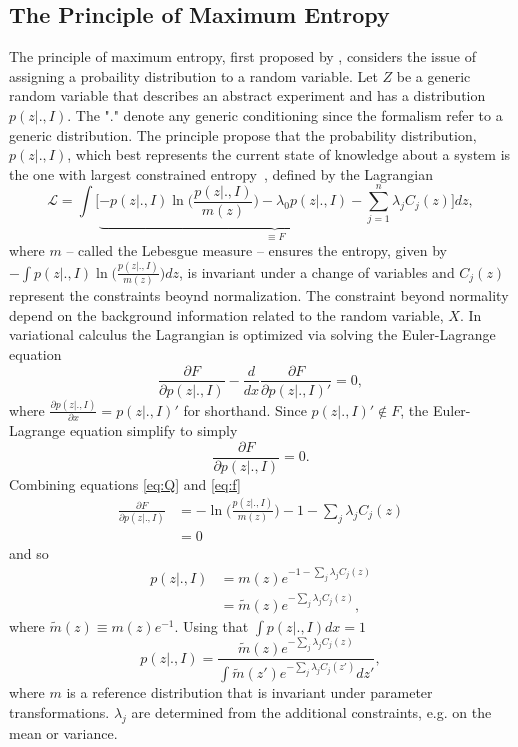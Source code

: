 \subsection{The Principle of Maximum Entropy}
\label{sec:maxent}
The principle of maximum entropy, first proposed by \citet{Jaynes1957}, considers the issue of assigning a probaility distribution to a random variable. Let $Z$ be a generic random variable that describes an abstract experiment and has a distribution $p(z|., I)$. The "$.$" denote any generic conditioning since the formalism refer to a generic distribution. The principle propose that the probability distribution, $p(z|., I)$, which best represents the current state of knowledge about a system is the one with largest constrained entropy~\citep{Sivia2006}, defined by the Lagrangian
\begin{equation}
	\mathcal{L} = \int\bigg[\underbrace{-p(z|., I)\ln\bigg(\frac{p(z|., I)}{m(z)}\bigg)-\lambda_0 p(z|., I)-\sum_{j=1}^{n}\lambda_jC_j(z)}_{\equiv F}\bigg]dz  ,
	\label{eq:Q}
\end{equation}
where $m$ -- called the Lebesgue measure -- ensures the entropy, given by $-\int p(z|., I)\ln\big(\frac{p(z|., I)}{m(z)}\big) dz$, is invariant under a change of variables and $C_j(z)$ represent the constraints beoynd normalization. The constraint beyond normality depend on the background information related to the random variable, $X$. In variational calculus the Lagrangian is optimized via solving the Euler-Lagrange equation
\begin{equation}
	\frac{\partial F}{\partial p(z|., I)}-\frac{d}{dx}\frac{\partial F}{\partial p(z|., I)'}=0,
\end{equation}
where $\frac{\partial p(z|., I)}{\partial x} = p(z|., I)'$ for shorthand. Since $p(z|., I)'\notin F$, the Euler-Lagrange equation simplify to simply
\begin{equation}
	\frac{\partial F}{\partial p(z|., I)}=0.
	\label{eq:f}
\end{equation}
Combining equations \eqref{eq:Q} and \eqref{eq:f}
\begin{equation}
	\begin{split}
		\frac{\partial F}{\partial p(z|., I)}&= -\ln\bigg(\frac{p(z|., I)}{m(z)}\bigg)-1-\sum_{j}\lambda_{j}C_j(z)\\
		&=0
	\end{split}
\end{equation}
and so
\begin{equation}
	\begin{split}
		p(z|., I)&=m(z)e^{-1-\sum_{j}\lambda_{j}C_j(z)}\\
		&=\tilde{m}(z)e^{-\sum_{j}\lambda_{j}C_j(z)},
	\end{split}
\end{equation}
where $\tilde{m}(z)\equiv m(z)e^{-1}$. Using that $\int p(z|., I) dx =1$
\begin{equation}
	p(z|., I)=\frac{\tilde{m}(z)e^{-\sum_{j}\lambda_{j}C_j(z)}}{\int \tilde{m}(z')e^{-\sum_{j}\lambda_{j}C_j(z')}dz'},
\end{equation}
where $m$ is a reference distribution that is invariant under parameter transformations. $\lambda_j$ are determined from the additional constraints, e.g. on the mean or variance.

